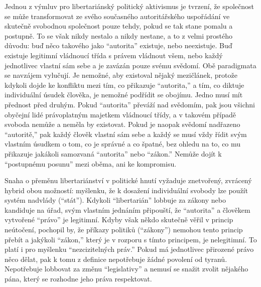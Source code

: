 \documentclass{book}
\begin{document}
Jednou z výmluv pro libertariánský politický aktivismus je tvrzení, že společnost se může transformovat ze svého současného autoritářského uspořádání ve skutečně svobodnou společnost pouze tehdy, pokud se tak stane pomalu a postupně. To se však nikdy nestalo a nikdy nestane, a to z velmi prostého důvodu: buď něco takového jako \enquote{autorita} existuje, nebo neexistuje. Buď existuje legitimní vládnoucí třída s právem vládnout všem, nebo každý jednotlivec vlastní sám sebe a je zavázán pouze svému svědomí. Obě paradigmata se navzájem vylučují. Je nemožné, aby existoval nějaký mezičlánek, protože kdykoli dojde ke konfliktu mezi tím, co přikazuje \enquote{autorita,} a tím, co diktuje individuální úsudek člověka, je nemožné podřídit se obojímu. Jedno musí mít přednost před druhým. Pokud \enquote{autorita} převáží nad svědomím, pak jsou všichni obyčejní lidé právoplatným majetkem vládnoucí třídy, a v takovém případě svoboda nemůže a neměla by existovat. Pokud je naopak svědomí nadřazeno \enquote{autoritě,} pak každý člověk vlastní sám sebe a každý se musí vždy řídit svým vlastním úsudkem o tom, co je správné a co špatné, bez ohledu na to, co mu přikazuje jakákoli samozvaná \enquote{autorita} nebo \enquote{zákon.} Nemůže dojít k \enquote{postupnému posunu} mezi oběma, ani ke kompromisu.

Snaha o přeměnu libertariánství v politické hnutí vyžaduje znetvořený, zvrácený hybrid obou možností: myšlenku, že k dosažení individuální svobody lze použít systém nadvlády (\enquote{stát}). Kdykoli \enquote{libertarián} lobbuje za zákony nebo kandiduje na úřad, svým vlastním jednáním připouští, že \enquote{autorita} a člověkem vytvořené \enquote{právo} je legitimní. Kdyby však někdo skutečně věřil v princip neútočení, pochopil by, že příkazy politiků (\enquote{zákony}) nemohou tento princip přebít a jakýkoli \enquote{zákon,} který je v rozporu s tímto principem, je nelegitimní. To platí i pro myšlenku \enquote{nezcizitelných práv.} Pokud má jednotlivec přirozené právo něco dělat, pak k tomu z definice nepotřebuje žádné povolení od tyranů. Nepotřebuje lobbovat za změnu \enquote{legislativy} a nemusí se snažit zvolit nějakého pána, který se rozhodne jeho práva respektovat.
\end{document}
